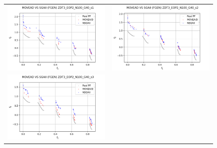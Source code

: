 \begin{figure}[H]
    \centering
    \begin{tabular}{c c}
    \includegraphics[scale=0.5]{figures/ZDT3_EOP2_N100_G40_T15/s1_comp.png} &
    \includegraphics[scale=0.5]{figures/ZDT3_EOP2_N100_G40_T15/s2_comp.png}\\
    \includegraphics[scale=0.5]{figures/ZDT3_EOP2_N100_G40_T15/s3_comp.png} &

\end{tabular}
\end{figure}
